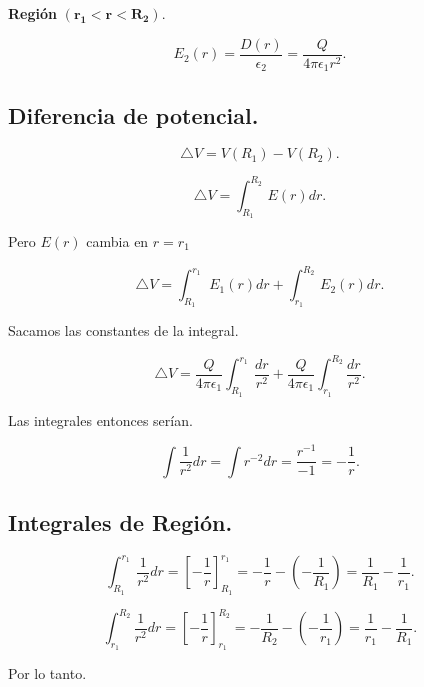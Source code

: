 \documentclass[a4paper,12pt]{article} %
\begin{document}
\begin{justify}
	\textbf{Región} \(\mathbf{ \left( r_1 < r < R_2 \right). }\)
\end{justify}

\[ E_2 \left( r \right) = \frac{D \left( r \right)}{\epsilon_2} = \frac{Q}{4 \pi \epsilon_1 r^2}. \]

\subsection{Diferencia de potencial.}

\[ \triangle V = V\left(R_1\right) - V\left(R_2\right).  \]

\[  \triangle V = \int_{R_1}^{R_2} \, E\left( r \right) dr.\]

\begin{justify}
	Pero \(E\left(r\right)\) cambia en \(r = r_1\)
\end{justify}

\[  \triangle V = \int_{R_1}^{r_1} \, E_1\left( r \right) dr + \int_{r_1}^{R_2} \, E_2\left( r \right) dr .\]

\begin{justify}
	Sacamos las constantes de la integral.
\end{justify}

\[ \triangle V = \frac{Q}{4 \pi \epsilon_1}\int_{R_1}^{r_1} \frac{dr}{r^2} + \frac{Q}{4 \pi \epsilon_1} \int_{r_1}^{R_2} \frac{dr}{r^2}. \]

\begin{justify}
	Las integrales entonces serían.
\end{justify}

\[ \int \frac{1}{r^2} dr = \int r^{-2} dr = \frac{r^{-1}}{-1} = -\frac{1}{r}. \]

\subsection{Integrales de Región.}

\[ \int_{R_1}^{r_1} \frac{1}{r^2} dr = \left[ - \frac{1}{r} \right]_{R_1}^{r_1} = - \frac{1}{r} - \left( - \frac{1}{R_1}\right) = \frac{1}{R_1} - \frac{1}{r_1}. \]

\vspace{\baselineskip}

\[ \int_{r_1}^{R_2} \frac{1}{r^2} dr = \left[ - \frac{1}{r} \right]_{r_1}^{R_2} = - \frac{1}{R_2} - \left( - \frac{1}{r_1}\right) = \frac{1}{r_1} - \frac{1}{R_1}. \]

\begin{justify}
	Por lo tanto.
\end{justify}
\end{document}
